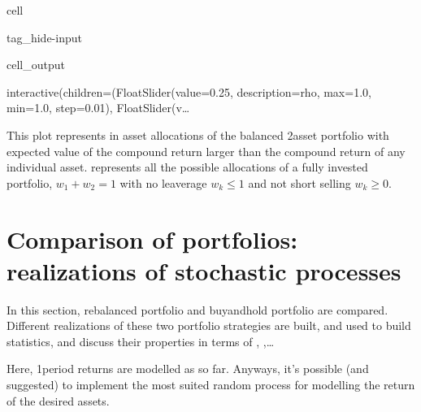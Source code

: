 \documentclass[letterpaper,10pt,english]{jupyterBook}
\begin{document}
\begin{sphinxuseclass}{cell}
\begin{sphinxuseclass}{tag_hide-input}\begin{sphinxVerbatimOutput}

\begin{sphinxuseclass}{cell_output}
\begin{sphinxVerbatim}[commandchars=\\\{\}]
interactive(children=(FloatSlider(value=\PYGZhy{}0.25, description=\PYGZsq{}rho\PYGZsq{}, max=1.0, min=\PYGZhy{}1.0, step=0.01), FloatSlider(v…
\end{sphinxVerbatim}

\noindent{}

\end{sphinxuseclass}\end{sphinxVerbatimOutput}

\end{sphinxuseclass}
\end{sphinxuseclass}
\sphinxAtStartPar
This plot represents in  asset allocations of the balanced 2\sphinxhyphen{}asset portfolio with expected value of the compound return larger than the compound return of any individual asset.  represents all the possible allocations of a fully invested portfolio, \(w_1+w_2=1\) with no leaverage \(w_k \le 1\) and not short selling \(w_k \ge 0\).


\section{Comparison of portfolios: realizations of stochastic processes}
\label{\detokenize{code/notebooks/rebalancing:comparison-of-portfolios-realizations-of-stochastic-processes}}
\sphinxAtStartPar
In this section, rebalanced portfolio and buy\sphinxhyphen{}and\sphinxhyphen{}hold portfolio are compared.
Different realizations of these two portfolio strategies are built, and used to build statistics, and discuss their properties in terms of , ,…

\sphinxAtStartPar
{} Here, 1\sphinxhyphen{}period returns are modelled as  so far. Anyways, it’s possible (and suggested) to implement the most suited random process for modelling the return of the desired assets.
\end{document}
